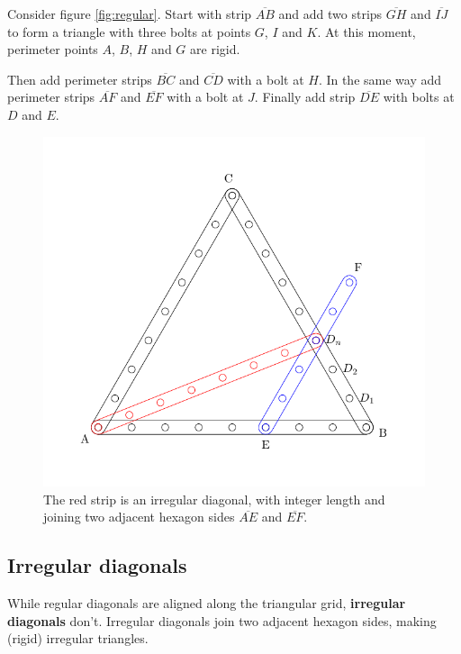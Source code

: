 \documentclass[11pt]{article}
\begin{document}
Consider figure \ref{fig:regular}.
Start with strip $\overline{AB}$ and add two strips $\overline{GH}$ and
$\overline{IJ}$ to form a triangle with three bolts at points $G$, $I$ and $K$. At this moment, perimeter points $A$, $B$, $H$ and $G$ are rigid.

Then add perimeter strips $\overline{BC}$ and $\overline{CD}$ with a bolt at $H$.
In the same way add perimeter strips $\overline{AF}$ and $\overline{EF}$ with a bolt at $J$.
Finally add strip $\overline{DE}$ with bolts at $D$ and $E$.



\begin{figure}[htpb]
\centering
\includegraphics[scale=0.8]{hexagon_angle}
\caption{The red strip is an irregular diagonal, with integer length 
and joining two adjacent hexagon sides $\overline{AE}$ and $\overline{EF}$.}
\label{fig:irregular}
\end{figure}

\subsection{Irregular diagonals}

While regular diagonals are aligned along the triangular grid, \textbf{irregular diagonals}
don't. Irregular diagonals join two adjacent hexagon sides, making (rigid) irregular triangles.
\end{document}
